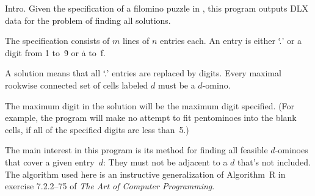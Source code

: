
\datethis

Intro. Given the specification of a filomino puzzle in ,
this program outputs {\mc DLX} data for the problem of finding
all solutions.

The specification consists of $m$ lines of $n$ entries each.
An entry is either `\..' or a digit from \.1 to~\.9 or \.a to~\.f.

A solution means that all `\..' entries are replaced by digits.
Every maximal rookwise connected set of cells labeled $d$ must
be a $d$-omino.

The maximum digit in the solution will be the maximum digit
specified. (For example, the program will make no attempt to
fit pentominoes into the blank cells, if all of the specified
digits are less than~\.5.)

The main interest in this program is its method for finding all
feasible $d$-ominoes that cover a given entry~$d$: They must not
be adjacent to a $d$ that's not included.
The algorithm used here is an instructive generalization of
Algorithm~R in exercise 7.2.2--75 of {\sl The Art of Computer
Programming}.

